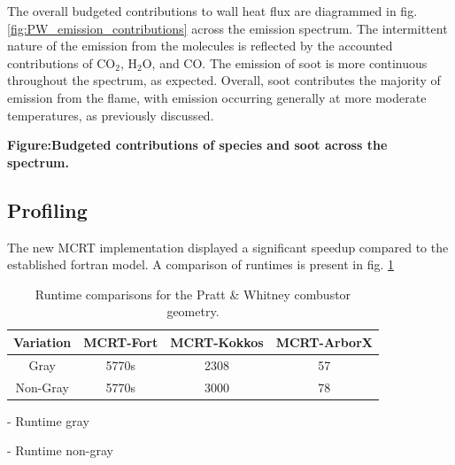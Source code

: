 The overall budgeted contributions to wall heat flux are diagrammed in fig. \ref{fig:PW_emission_contributions} across the emission spectrum.
The intermittent nature of the emission from the molecules is reflected by the accounted contributions of CO$_2$, H$_2$O, and CO. The emission of soot is more continuous throughout the spectrum, as expected.
Overall, soot contributes the majority of emission from the flame, with emission occurring generally at more moderate temperatures, as previously discussed.

\textbf{\checkmark Figure:Budgeted contributions of species and soot across the spectrum.}

\subsection{Profiling}
The new MCRT implementation displayed a significant speedup compared to the established fortran model. A comparison of runtimes is present in fig. \ref{table:PW_runtime_table}

\begin{table}[h!]
\centering
\begin{tabular}{||c c c c||} 
 \hline
 Variation & MCRT-Fort & MCRT-Kokkos & MCRT-ArborX \\ [0.5ex] 
 \hline\hline
 Gray & 5770s     & 2308 & 57  \\ %
 Non-Gray & 5770s & 3000 & 78 \\ [1ex] 
 \hline
\end{tabular}
\caption{Runtime comparisons for the Pratt \& Whitney combustor geometry.}
\label{table:PW_runtime_table}
\end{table}


- Runtime gray

- Runtime non-gray


